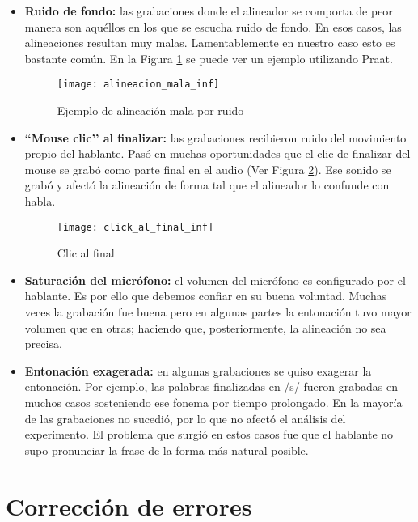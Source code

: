 \begin{itemize}
    \item \textbf{Ruido de fondo:} las grabaciones donde el alineador se comporta de peor manera son aquéllos en los que se escucha ruido de fondo. En esos casos, las alineaciones resultan muy malas. Lamentablemente en nuestro caso esto es bastante común. En la Figura \ref{alinMala} se puede ver un ejemplo utilizando Praat.

\begin{figure}[h!]
    \centerline{\texttt{[image: alineacion\_mala\_inf]} }
    \caption{Ejemplo de alineación mala por ruido}
    \label{alinMala}
\end{figure}

    \item \textbf{``Mouse clic’’ al finalizar:} las grabaciones recibieron ruido del movimiento propio del hablante. Pasó en muchas oportunidades que el clic de finalizar del mouse se grabó como parte final en el audio (Ver Figura \ref{clickFinal}). Ese sonido se grabó y afectó la alineación de forma tal que el alineador lo confunde con habla.
    
\begin{figure}[h!]
    \centerline{\texttt{[image: click\_al\_final\_inf]} }
    \caption{Clic al final}
    \label{clickFinal}
\end{figure}

    \item \textbf{Saturación del micrófono:} el volumen del micrófono es configurado por el hablante. Es por ello que debemos confiar en su buena voluntad. Muchas veces la grabación fue buena pero en algunas partes la entonación tuvo mayor volumen que en otras; haciendo que, posteriormente, la alineación no sea precisa.
    
    \item \textbf{Entonación exagerada:} en algunas grabaciones se quiso exagerar la entonación. Por ejemplo, las palabras finalizadas en /s/ fueron grabadas en muchos casos sosteniendo ese fonema por tiempo prolongado. En la mayoría de las grabaciones no sucedió, por lo que no afectó el análisis del experimento. El problema que surgió en estos casos fue que el hablante no supo pronunciar la frase de la forma más natural posible. 
    
\end{itemize}

\section{Corrección de errores}

